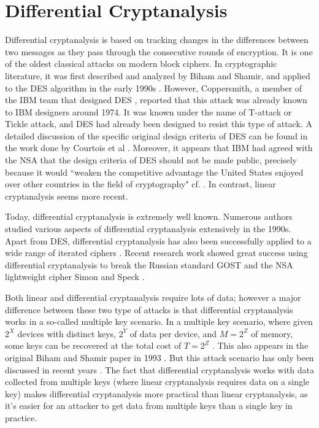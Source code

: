 \section{Differential Cryptanalysis} \label{sec:differentialCry}
Differential cryptanalysis is based on tracking changes in the differences between two messages as they pass through the consecutive rounds of encryption. It is one of the oldest classical attacks on modern block ciphers. In cryptographic literature, it was first described and analyzed by Biham and Shamir, and applied to the DES algorithm in the early 1990s \cite{biham1993differential}. However, Coppersmith, a member of the IBM team that designed DES \cite{coppersmith1994data,coppersmith2000development,courtois2003s},  reported that this attack was already known to IBM designers around 1974. It was known under the name of T-attack or Tickle attack, and DES had already been designed to resist this type of attack. A detailed discussion of the specific original design criteria of DES can be found in the work done by Courtois et al \cite{courtois2003s}. Moreover, it appears that IBM had agreed with the NSA that the design criteria of DES should not be made public, precisely because it would ``weaken the competitive advantage the United States enjoyed over other countries in the field of cryptography" cf. \cite{coppersmith1994data,coppersmith2000development}. In contrast, linear cryptanalysis seems more recent. 

Today, differential cryptanalysis is extremely well known. Numerous authors studied various aspects of differential cryptanalysis extensively in the 1990s. Apart from DES, differential cryptanalysis has also been successfully applied to a wide range of iterated ciphers \cite{knudsen1993cryptanalysis,massey1994safer}.  Recent research work showed great success using differential cryptanalysis to break the Russian standard GOST  \cite{gostdc0,gostdc1} and the NSA lightweight cipher Simon and Speck \cite{simon3,simon2}.

Both linear and differential cryptanalysis require lots of data; however a major difference between these two type of attacks is that differential cryptanalysis works in a so-called multiple key scenario. In a multiple key scenario, where given $2^{X}$ devices with distinct keys, $2^{Y}$ of data per device, and $M = 2^{Z}$ of memory, some keys can be recovered at the total cost of $T = 2^{Z}$ \cite{courtois2013cryptanalysis}. This also appears in the original Biham and Shamir paper in 1993 \cite{biham1993differential}. But this attack scenario has only been discussed in recent years \cite{courtois2013cryptanalysis}. The fact that differential cryptanalysis works with data collected from multiple keys (where linear cryptanalysis requires data on a single key) makes differential cryptanalysis more practical than linear cryptanalysis, as it's easier for an attacker to get data from multiple keys than a single key in practice.

